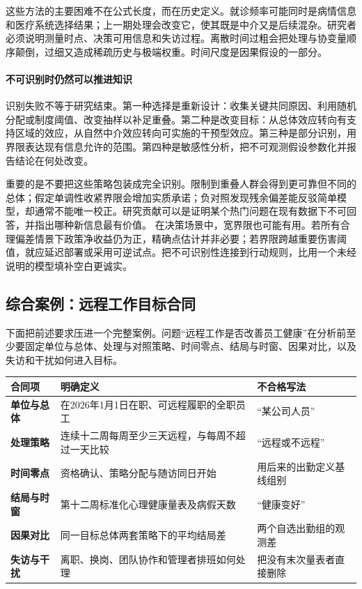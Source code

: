 这些方法的主要困难不在公式长度，而在历史定义。就诊频率可能同时是病情信息和医疗系统选择结果；上一期处理会改变它，使其既是中介又是后续混杂。研究者必须说明测量时点、决策可用信息和失访过程。离散时间过粗会把处理与协变量顺序颠倒，过细又造成稀疏历史与极端权重。时间尺度是因果假设的一部分。

\paragraph{不可识别时仍然可以推进知识}

识别失败不等于研究结束。第一种选择是重新设计：收集关键共同原因、利用随机分配或制度阈值、改变抽样以补足重叠。第二种是改变目标：从总体效应转向有支持区域的效应，从自然中介效应转向可实施的干预型效应。第三种是部分识别，用界限表达现有信息允许的范围。第四种是敏感性分析，把不可观测假设参数化并报告结论在何处改变。

重要的是不要把这些策略包装成完全识别。限制到重叠人群会得到更可靠但不同的总体；假定单调性收紧界限会增加实质承诺；负对照发现残余偏差能反驳简单模型，却通常不能唯一校正。研究贡献可以是证明某个热门问题在现有数据下不可回答，并指出哪种新信息最有价值。
在决策场景中，宽界限也可能有用。若所有合理偏差情景下政策净收益仍为正，精确点估计并非必要；若界限跨越重要伤害阈值，就应延迟部署或采用可逆试点。把不可识别性连接到行动规则，比用一个未经说明的模型填补空白更诚实。

\subsection{综合案例：远程工作目标合同}

下面把前述要求压进一个完整案例。问题“远程工作是否改善员工健康”在分析前至少要固定单位与总体、处理与对照策略、时间零点、结局与时窗、因果对比，以及失访和干扰如何进入目标。

\begin{center}
\small
\begin{tabularx}{\textwidth}{>{\bfseries}p{2.1cm}X X}
\toprule
合同项 & 明确定义 & 不合格写法\\
\midrule
单位与总体 & 在2026年1月1日在职、可远程履职的全职员工 & “某公司人员”\\
处理策略 & 连续十二周每周至少三天远程，与每周不超过一天比较 & “远程或不远程”\\
时间零点 & 资格确认、策略分配与随访同日开始 & 用后来的出勤定义基线组别\\
结局与时窗 & 第十二周标准化心理健康量表及病假天数 & “健康变好”\\
因果对比 & 同一目标总体两套策略下的平均结局差 & 两个自选出勤组的观测差\\
失访与干扰 & 离职、换岗、团队协作和管理者排班如何处理 & 把没有末次量表者直接删除\\
\bottomrule
\end{tabularx}
\end{center}

